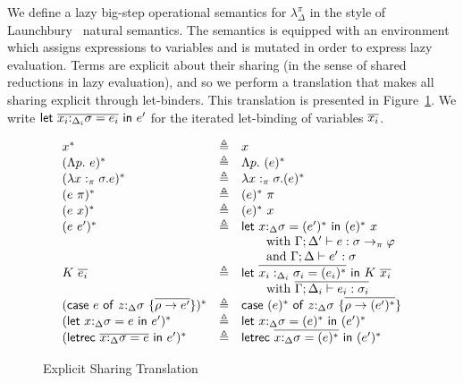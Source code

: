 \documentclass[acmsmall,review,anonymous,screen]{acmart}
\newcommand{\llet}[2]{\mathsf{let}~#1~\mathsf{in}~#2}
\newcommand{\lletrec}[2]{\mathsf{letrec}~#1~\mathsf{in}~#2}
\newcommand{\ccase}[2]{\mathsf{case}~#1~\mathsf{of}~#2}
\begin{document}
We define a lazy big-step operational semantics for $\lambda_\Delta^\pi$ in the
style of Launchbury~\cite{10.1145/158511.158618} natural semantics. The semantics is
equipped with an environment which assigns expressions to variables and is
mutated in order to express lazy evaluation. Terms are explicit about
their sharing (in the sense of shared reductions in lazy evaluation),
and so we perform a translation that makes all sharing explicit
through let-binders. This translation is presented in Figure~\ref{fig:explicitsharing}.
We write $\llet{\ov{x_i{:}_{\Delta_i}\sigma = e_i}}{e'}$ for the iterated
let-binding of variables $\overline{x_i}$.
\begin{figure}
\[
  \begin{array}{lclr}
    x^* & \triangleq & x\\

    (\Lambda p.~e)^* & \triangleq & \Lambda p.~(e)^*\\
    (\lambda x:_\pi\sigma .e)^* & \triangleq & \lambda x:_\pi\sigma . (e)^*\\
    (e~\pi)^* & \triangleq & (e)^*~\pi\\
    (e~x)^* & \triangleq & (e)^*~x\\
    (e~e')^* & \triangleq & \llet{x{:}_{\Delta}\sigma =
                            (e')^*}{(e)^*~x}     \\ &&\qquad \mbox{with
                            $\Gamma;\Delta' \vdash e :
                            \sigma\rightarrow_\pi \varphi$} \\ &&\qquad \mbox{and
                                       $\Gamma;\Delta \vdash e' : \sigma$}\\
      K~\ov{e_i} & \triangleq & \llet{\ov{x_i:_{\Delta_i} \sigma_i =
                                   (e_i)^*}}{K~\ov{x_i}} \\ &&
                                       \qquad\mbox{with
                                       $\ov{\Gamma;\Delta_i\vdash
                                       e_i :
                                       \sigma_i}$}\\                                              
(\ccase{e}{z{:}_{\Delta}\sigma~\{\overline{\rho\to e'}\}})^* &
                                                               \triangleq
                                &
                                  \ccase{(e)^*}{z{:}_{\Delta}\sigma~\{\overline{\rho\to (e')^*}\}}\\
    (\llet{x{:}_{\Delta}\sigma = e}{e'}      )^* & \triangleq & \llet{x{:}_{\Delta}\sigma  = (e)^*}{(e')^*}    \\
    (\lletrec{\overline{x{:}_{\Delta}\sigma = e}}{e'}  )^* & \triangleq &\lletrec{\overline{x{:}_{\Delta}\sigma = (e)^*}}{(e')^*}  
      \end{array}
    \]
    \caption{Explicit Sharing Translation\label{fig:explicitsharing}}
  \end{figure}
\end{document}
